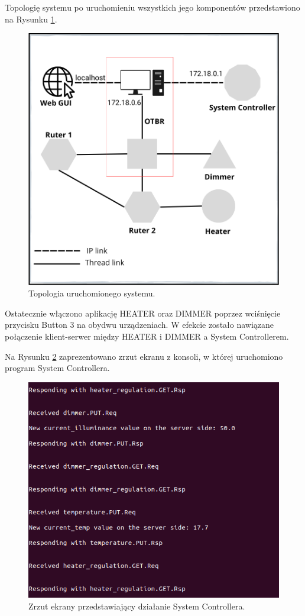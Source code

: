 Topologię systemu po uruchomieniu wszystkich jego komponentów przedstawiono na Rysunku \ref{fig:system-topology}.

\begin{figure}[H]
    \centering
    \includegraphics[width=0.8\linewidth]{graphics/system-topology.png}
    \caption{Topologia uruchomionego systemu.}
    \label{fig:system-topology}
\end{figure}

Ostatecznie włączono aplikację HEATER oraz DIMMER poprzez wciśnięcie przycisku Button 3 na obydwu urządzeniach. W efekcie zostało nawiązane połączenie klient-serwer między HEATER i DIMMER a System Controllerem.

Na Rysunku \ref{fig:serwer-app} zaprezentowano zrzut ekranu z konsoli, w której uruchomiono program System Controllera.

\begin{figure}[H]
    \centering
    \includegraphics[width=0.8\linewidth]{graphics/screenshots/verification/system-controller-communication.png}
    \caption{Zrzut ekrany przedstawiający działanie System Controllera.}
    \label{fig:serwer-app}
\end{figure}


